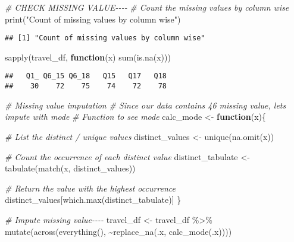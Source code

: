 \documentclass[
]{article}
\newenvironment{Shaded}{\begin{snugshade}}{\end{snugshade}}
\newcommand{\CommentTok}[1]{\textcolor[rgb]{0.56,0.35,0.01}{\textit{#1}}}
\newcommand{\ControlFlowTok}[1]{\textcolor[rgb]{0.13,0.29,0.53}{\textbf{#1}}}
\newcommand{\FunctionTok}[1]{\textcolor[rgb]{0.00,0.00,0.00}{#1}}
\newcommand{\NormalTok}[1]{#1}
\newcommand{\OtherTok}[1]{\textcolor[rgb]{0.56,0.35,0.01}{#1}}
\newcommand{\SpecialCharTok}[1]{\textcolor[rgb]{0.00,0.00,0.00}{#1}}
\newcommand{\StringTok}[1]{\textcolor[rgb]{0.31,0.60,0.02}{#1}}
\begin{document}
\hfill\break

\begin{Shaded}
\begin{Highlighting}[]
\CommentTok{\# CHECK MISSING VALUE{-}{-}{-}{-}}
\CommentTok{\# Count the missing values by column wise}
\FunctionTok{print}\NormalTok{(}\StringTok{"Count of missing values by column wise"}\NormalTok{)}
\end{Highlighting}
\end{Shaded}

\begin{verbatim}
## [1] "Count of missing values by column wise"
\end{verbatim}

\begin{Shaded}
\begin{Highlighting}[]
\FunctionTok{sapply}\NormalTok{(travel\_df, }\ControlFlowTok{function}\NormalTok{(x) }\FunctionTok{sum}\NormalTok{(}\FunctionTok{is.na}\NormalTok{(x)))}
\end{Highlighting}
\end{Shaded}

\begin{verbatim}
##   Q1_ Q6_15 Q6_18   Q15   Q17   Q18 
##    30    72    75    74    72    78
\end{verbatim}

\begin{Shaded}
\begin{Highlighting}[]
\CommentTok{\# Missing value imputation}
\CommentTok{\# Since our data contains 46 missing value, let\textquotesingle{}s impute with mode}
\CommentTok{\# Function to see mode}
\NormalTok{calc\_mode }\OtherTok{\textless{}{-}} \ControlFlowTok{function}\NormalTok{(x)\{}
  
  \CommentTok{\# List the distinct / unique values}
\NormalTok{  distinct\_values }\OtherTok{\textless{}{-}} \FunctionTok{unique}\NormalTok{(}\FunctionTok{na.omit}\NormalTok{(x))}
  
  \CommentTok{\# Count the occurrence of each distinct value}
\NormalTok{  distinct\_tabulate }\OtherTok{\textless{}{-}} \FunctionTok{tabulate}\NormalTok{(}\FunctionTok{match}\NormalTok{(x, distinct\_values))}
  
  \CommentTok{\# Return the value with the highest occurrence}
\NormalTok{  distinct\_values[}\FunctionTok{which.max}\NormalTok{(distinct\_tabulate)]}
\NormalTok{\}}

\CommentTok{\# Impute missing value{-}{-}{-}{-}}
\NormalTok{travel\_df }\OtherTok{\textless{}{-}}\NormalTok{ travel\_df }\SpecialCharTok{\%\textgreater{}\%} 
  \FunctionTok{mutate}\NormalTok{(}\FunctionTok{across}\NormalTok{(}\FunctionTok{everything}\NormalTok{(), }\SpecialCharTok{\textasciitilde{}}\FunctionTok{replace\_na}\NormalTok{(.x, }\FunctionTok{calc\_mode}\NormalTok{(.x))))}
\end{Highlighting}
\end{Shaded}
\end{document}
